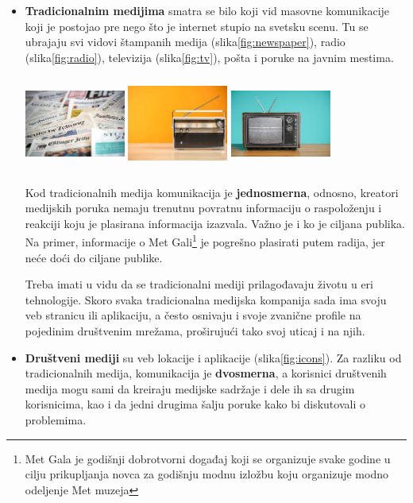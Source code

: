 \documentclass[a4paper]{article}
\begin{document}
\begin{itemize}
	\item \textbf{Tradicionalnim medijima} smatra se bilo koji vid masovne komunikacije koji je postojao pre nego što je internet stupio na svetsku scenu. Tu se ubrajaju svi vidovi štampanih medija (slika\ref{fig:newspaper}), radio (slika\ref{fig:radio}), televizija (slika\ref{fig:tv}), pošta i poruke na javnim mestima.

	
	\includegraphics[width=1.3in,height=1.225in]{slika 1.jpg}\label{fig:newspaper}
	\includegraphics[width=1.3in,height=1.225in]{slika 2.jpg}\label{fig:radio}
	\includegraphics[width=1.3in,height=1.225in]{slika 3.jpg}\label{fig:tv}

Kod tradicionalnih medija komunikacija je \textbf{jednosmerna}, odnosno, kreatori medijskih poruka nemaju trenutnu povratnu informaciju o raspoloženju i reakciji koju je plasirana informacija izazvala. Važno je i ko je ciljana publika. Na primer, informacije o Met Gali\footnote{Met Gala je godišnji dobrotvorni događaj koji se organizuje svake godine u cilju prikupljanja novca za godišnju modnu izložbu koju organizuje modno odeljenje Met muzeja } je pogrešno plasirati putem radija, jer neće doći do ciljane publike.

	
Treba imati u vidu da se tradicionalni mediji prilagođavaju životu u eri tehnologije. Skoro svaka tradicionalna medijska kompanija sada ima svoju veb stranicu ili aplikaciju, a često osnivaju i svoje zvanične profile na pojedinim društvenim mrežama, proširujući tako svoj uticaj i na njih.

	
	\item \textbf{Društveni mediji} su veb lokacije i aplikacije (slika\ref{fig:icons}). Za
	razliku od tradicionalnih medija, komunikacija je \textbf{dvosmerna}, a korisnici
	društvenih medija mogu sami da kreiraju medijske sadržaje i dele ih sa
	drugim korisnicima, kao i da jedni drugima šalju poruke kako bi
	diskutovali o problemima.
 \end{itemize}
	
\end{document}
